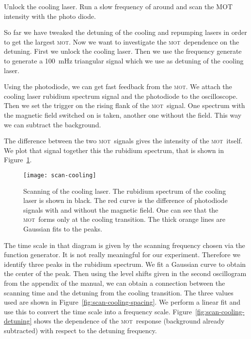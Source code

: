\documentclass[11pt, english, fleqn, DIV=15, headinclude, BCOR=2cm]{scrreprt}
\newcommand\mot{\textsc{mot}}
\begin{document}
Unlock the cooling laser. Run a slow frequency of around
and scan the MOT intensity with the photo diode. 

So far we have tweaked the detuning of the cooling and repumping lasers in
order to get the largest \mot. Now we want to investigate the \mot\ dependence
on the detuning. First we unlock the cooling laser. Then we use the frequency
generate to generate a \SI{100}{\milli\hertz} triangular signal which we use
as detuning of the cooling laser.

Using the photodiode, we can get fast feedback from the \mot. We attach the
cooling laser rubidium spectrum signal and the photodiode to the oscilloscope.
Then we set the trigger on the rising flank of the \mot\ signal. One spectrum
with the magnetic field switched on is taken, another one without the field.
This way we can subtract the background.

The difference between the two \mot\ signals gives the intensity of the \mot\
itself. We plot that signal together this the rubidium spectrum, that is shown
in Figure~\ref{fig:scan-cooling}.


\begin{figure}
    \centering
    \texttt{[image: scan-cooling]}
    \caption{%
        Scanning of the cooling laser. The rubidium spectrum of the cooling
        laser is shown in black. The red curve is the difference of photodiode
        signals with and without the magnetic field. One can see that the \mot\
        forms only at the cooling transition. The thick orange lines are
        Gaussian fits to the peaks.
    }
    \label{fig:scan-cooling}
\end{figure}

The time scale in that diagram is given by the scanning frequency chosen via
the function generator. It is not really meaningful for our experiment.
Therefore we identify three peaks in the rubidium spectrum. We fit a Gaussian
curve to obtain the center of the peak. Then using the level shifts given in
the second oscillogram from the appendix of the manual, we can obtain a
connection between the scanning time and the detuning from the cooling
transition. The three values used are shown in
Figure~\ref{fig:scan-cooling-spacing}. We perform a linear fit and use this to
convert the time scale into a frequency scale.
Figure~\ref{fig:scan-cooling-detuning} shows the dependence of the \mot\
response (background already subtracted) with respect to the detuning
frequency.
\end{document}
